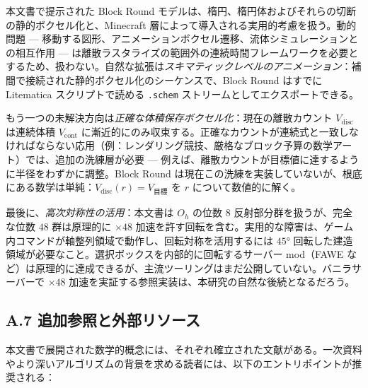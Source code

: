 \documentclass[12pt,a4paper]{scrartcl}
\newcommand{\code}[1]{\texttt{\small #1}}
\begin{document}
本文書で提示された Block Round モデルは、楕円、楕円体およびそれらの切断の静的ボクセル化と、Minecraft 層によって導入される実用的考慮を扱う。動的問題 — 移動する図形、アニメーションボクセル遷移、流体シミュレーションとの相互作用 — は離散ラスタライズの範囲外の連続時間フレームワークを必要とするため、扱わない。自然な拡張は\emph{スキマティックレベルのアニメーション}：補間で接続された静的ボクセル化のシーケンスで、Block Round はすでに Litematica スクリプトで読める \code{.schem} ストリームとしてエクスポートできる。

もう一つの未解決方向は\emph{正確な体積保存ボクセル化}：現在の離散カウント $V_{\mathrm{disc}}$ は連続体積 $V_{\mathrm{cont}}$ に漸近的にのみ収束する。正確なカウントが連続式と一致しなければならない応用（例：レンダリング競技、厳格なブロック予算の数学アート）では、追加の洗練層が必要 — 例えば、離散カウントが目標値に達するように半径をわずかに調整。Block Round は現在この洗練を実装していないが、根底にある数学は単純：$V_{\mathrm{disc}}(r) = V_{\mathrm{目標}}$ を $r$ について数値的に解く。

最後に、\emph{高次対称性の活用}：本文書は $O_h$ の位数 $8$ 反射部分群を扱うが、完全な位数 $48$ 群は原理的に $\times 48$ 加速を許す回転を含む。実用的な障害は、ゲーム内コマンドが軸整列領域で動作し、回転対称を活用するには $45°$ 回転した建造領域が必要なこと。選択ボックスを内部的に回転するサーバー mod（FAWE など）は原理的に達成できるが、主流ツーリングはまだ公開していない。バニラサーバーで $\times 48$ 加速を実証する参照実装は、本研究の自然な後続となるだろう。

\subsection*{A.7 追加参照と外部リソース}

本文書で展開された数学的概念には、それぞれ確立された文献がある。一次資料やより深いアルゴリズムの背景を求める読者には、以下のエントリポイントが推奨される：
\end{document}
